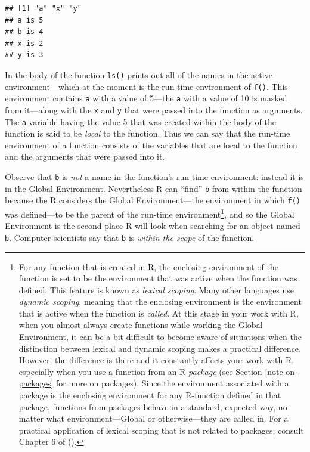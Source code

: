 \documentclass[]{book}
\let\rmarkdownfootnote\footnote%
\def\footnote{\protect\rmarkdownfootnote}
\theoremstyle{definition}
\theoremstyle{definition}
\theoremstyle{remark}
\begin{document}
{\begin{verbatim}
## [1] "a" "x" "y"
## a is 5
## b is 4
## x is 2
## y is 3
\end{verbatim}

In the body of the function \texttt{ls()} prints out all of the names in
the active environment---which at the moment is the run-time environment
of \texttt{f()}. This environment contains \texttt{a} with a value of
5---the \texttt{a} with a value of 10 is masked from it---along with the
\texttt{x} and \texttt{y} that were passed into the function as
arguments. The \texttt{a} variable having the value 5 that was created
within the body of the function is said to be \emph{local} to the
function. Thus we can say that the run-time environment of a function
consists of the variables that are local to the function and the
arguments that were passed into it.

Observe that \texttt{b} is \emph{not} a name in the function's run-time
environment: instead it is in the Global Environment. Nevertheless R can
``find'' \texttt{b} from within the function because the R considers the
Global Environment---the environment in which \texttt{f()} was
defined---to be the parent of the run-time environment\footnote{For any
  function that is created in R, the enclosing environment of the
  function is set to be the environment that was active when the
  function was defined. This feature is known as \emph{lexical scoping}.
  Many other languages use \emph{dynamic scoping}, meaning that the
  enclosing environment is the environment that is active when the
  function is \emph{called}. At this stage in your work with R, when you
  almost always create functions while working the Global Environment,
  it can be a bit difficult to become aware of situations when the
  distinction between lexical and dynamic scoping makes a practical
  difference. However, the difference is there and it constantly affects
  your work with R, especially when you use a function from an R
  \emph{package} (see Section \ref{note-on-packages} for more on
  packages). Since the environment associated with a package is the
  enclosing environment for any R-function defined in that package,
  functions from packages behave in a standard, expected way, no matter
  what environment---Global or otherwise---they are called in. For a
  practical application of lexical scoping that is not related to
  packages, consult Chapter 6 of (\citet{Grolemund2014}).}, and so the
Global Environment is the second place R will look when searching for an
object named \texttt{b}. Computer scientists say that \texttt{b} is
\emph{within the scope}  of the function.

}
\end{document}
